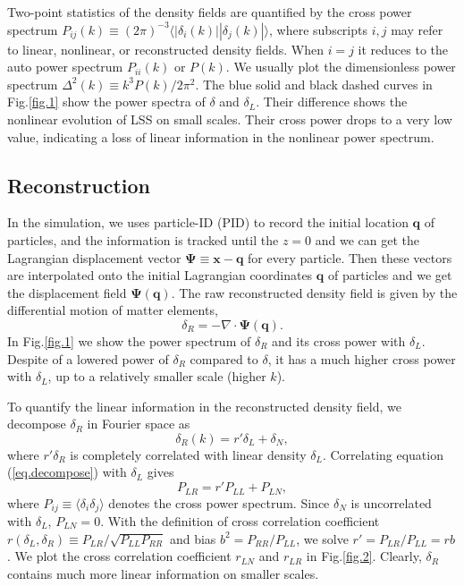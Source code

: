 \documentclass[aps,prd,twocolumn,superscriptaddress,amsfont,amssymb,amsmath,nofootinbib,showpacs,balancelastpage]{revtex4-1}
\newcommand{\bs}{\boldsymbol}
\begin{document}
Two-point statistics of the density fields are quantified by the cross power 
spectrum $P_{ij}(k)\equiv(2\pi)^{-3}\langle|\delta_i(k)||\delta_j(k)|\rangle$, 
where subscripts $i,j$ may refer to linear, nonlinear, or reconstructed density 
fields. When $i=j$ it reduces to the auto power spectrum $P_{ii}(k)$ or $P(k)$. We 
usually plot the dimensionless power spectrum $\Delta^2(k)\equiv k^3P(k)/2\pi^2$. 
The blue solid and black dashed curves in Fig.\ref{fig.1} show the power spectra of 
$\delta$ and $\delta_L$. Their difference shows the nonlinear evolution of LSS on 
small scales. Their cross power drops to a very low value, indicating a loss of 
linear information in the nonlinear power spectrum.

\subsection{Reconstruction}
In the simulation, we uses particle-ID (PID) to record the initial location ${\bs 
q}$ of particles, and the information is tracked until the $z=0$ and we can get the 
Lagrangian displacement vector ${\bs \Psi}\equiv{\bs x}-{\bs q}$ for every 
particle. Then these vectors are interpolated onto the initial Lagrangian 
coordinates ${\bs q}$ of particles and we get the displacement field ${\bs \Psi}
({\bs q})$.
The raw reconstructed density field is given by the differential motion of matter 
elements,
\begin{equation}
    \delta_R=-\nabla\cdot{\bs \Psi}({\bs q}).
\end{equation}
In Fig.\ref{fig.1} we show the power spectrum of $\delta_R$ and its cross power with $\delta_L$. Despite of a lowered power of $\delta_R$ compared to $\delta$, it has a much higher cross power with $\delta_L$, up to a relatively smaller scale (higher $k$).


To quantify the linear information in the reconstructed density field, we decompose $\delta_R$ in Fourier space as
\begin{equation}\label{eq.decompose}
    \delta_R(k)=r'\delta_L+\delta_N,
\end{equation}
where $r'\delta_R$ is completely correlated with linear density $\delta_L$. Correlating equation (\ref{eq.decompose}) with $\delta_L$ gives
\begin{equation}
    P_{LR}=r'P_{LL}+P_{LN},
\end{equation}
where $P_{ij}\equiv\langle\delta_i\delta_j\rangle$ denotes the cross power 
spectrum. Since $\delta_N$ is uncorrelated with $\delta_L$, $P_{LN}=0$. With the 
definition of cross correlation coefficient $r(\delta_L,\delta_R)\equiv P_{LR}/\sqrt{P_{LL}P_{RR}}$ 
and bias $b^2=P_{RR}/P_{LL}$, we solve $r'=P_{LR}/P_{LL}=rb$. We plot the cross 
correlation coefficient $r_{LN}$ and $r_{LR}$ in Fig.\ref{fig.2}. Clearly, $
\delta_R$ contains much more linear information on smaller scales.
\end{document}
